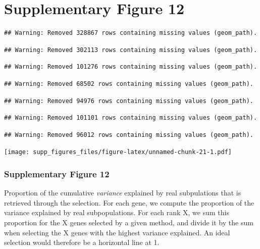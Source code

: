 \documentclass[]{article}
\begin{document}
\newpage

\hypertarget{supplementary-figure-12}{%
\section{Supplementary Figure 12}\label{supplementary-figure-12}}

\begin{verbatim}
## Warning: Removed 328867 rows containing missing values (geom_path).
\end{verbatim}

\begin{verbatim}
## Warning: Removed 302113 rows containing missing values (geom_path).
\end{verbatim}

\begin{verbatim}
## Warning: Removed 101276 rows containing missing values (geom_path).
\end{verbatim}

\begin{verbatim}
## Warning: Removed 68502 rows containing missing values (geom_path).
\end{verbatim}

\begin{verbatim}
## Warning: Removed 94976 rows containing missing values (geom_path).
\end{verbatim}

\begin{verbatim}
## Warning: Removed 101101 rows containing missing values (geom_path).
\end{verbatim}

\begin{verbatim}
## Warning: Removed 96012 rows containing missing values (geom_path).
\end{verbatim}

\texttt{[image: supp\_figures\_files/figure-latex/unnamed-chunk-21-1.pdf]}

\hypertarget{supplementary-figure-12-1}{%
\subsubsection{Supplementary Figure
12}\label{supplementary-figure-12-1}}

Proportion of the cumulative \emph{variance} explained by real
subpulations that is retrieved through the selection. For each gene, we
compute the proportion of the variance explained by real subpopulations.
For each rank X, we sum this proportion for the X genes selected by a
given method, and divide it by the sum when selecting the X genes with
the highest variance explained. An ideal selection would therefore be a
horizontal line at 1.
\end{document}
